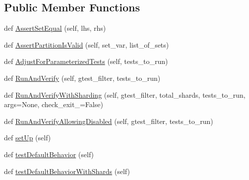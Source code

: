 \subsection*{Public Member Functions}
\begin{DoxyCompactItemize}
\item 
def \mbox{\hyperlink{classgoogletest-master_1_1googletest_1_1test_1_1googletest-filter-unittest_1_1_g_test_filter_unit_test_ab0ae0123b5d053af4360f0648304617c}{Assert\+Set\+Equal}} (self, lhs, rhs)
\item 
def \mbox{\hyperlink{classgoogletest-master_1_1googletest_1_1test_1_1googletest-filter-unittest_1_1_g_test_filter_unit_test_a5866660b652729d64a1dae2575e3103c}{Assert\+Partition\+Is\+Valid}} (self, set\+\_\+var, list\+\_\+of\+\_\+sets)
\item 
def \mbox{\hyperlink{classgoogletest-master_1_1googletest_1_1test_1_1googletest-filter-unittest_1_1_g_test_filter_unit_test_a4bfac6c852620e9231615e110e28f5a3}{Adjust\+For\+Parameterized\+Tests}} (self, tests\+\_\+to\+\_\+run)
\item 
def \mbox{\hyperlink{classgoogletest-master_1_1googletest_1_1test_1_1googletest-filter-unittest_1_1_g_test_filter_unit_test_aadf34d7bb087de45633e51b90838ccf3}{Run\+And\+Verify}} (self, gtest\+\_\+filter, tests\+\_\+to\+\_\+run)
\item 
def \mbox{\hyperlink{classgoogletest-master_1_1googletest_1_1test_1_1googletest-filter-unittest_1_1_g_test_filter_unit_test_afac3ac76451fb6f13b43870dfa83eac9}{Run\+And\+Verify\+With\+Sharding}} (self, gtest\+\_\+filter, total\+\_\+shards, tests\+\_\+to\+\_\+run, args=None, check\+\_\+exit\+\_=False)
\item 
def \mbox{\hyperlink{classgoogletest-master_1_1googletest_1_1test_1_1googletest-filter-unittest_1_1_g_test_filter_unit_test_a1e42f9ae1c2e8f46d41071301b88a08d}{Run\+And\+Verify\+Allowing\+Disabled}} (self, gtest\+\_\+filter, tests\+\_\+to\+\_\+run)
\item 
def \mbox{\hyperlink{classgoogletest-master_1_1googletest_1_1test_1_1googletest-filter-unittest_1_1_g_test_filter_unit_test_a8af7e355d961a23f7339852a8d3a00e1}{set\+Up}} (self)
\item 
def \mbox{\hyperlink{classgoogletest-master_1_1googletest_1_1test_1_1googletest-filter-unittest_1_1_g_test_filter_unit_test_a4bcfa8626c931ffa2332105b3fe82482}{test\+Default\+Behavior}} (self)
\item 
def \mbox{\hyperlink{classgoogletest-master_1_1googletest_1_1test_1_1googletest-filter-unittest_1_1_g_test_filter_unit_test_aa6b4e5aecd8a228a6574579c87ea6028}{test\+Default\+Behavior\+With\+Shards}} (self)

\end{DoxyCompactItemize}
